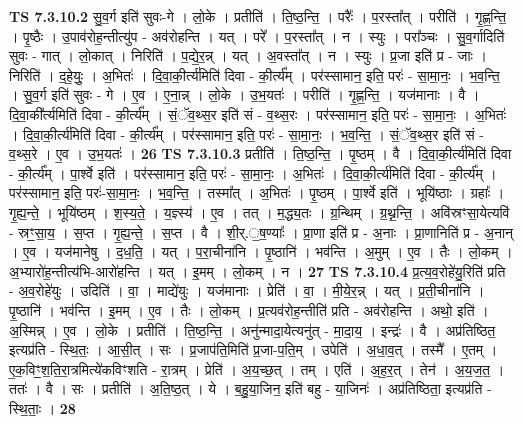 \documentclass[17pt]{extarticle}
\begin{document}
                                \textbf{ TS 7.3.10.2} \newline
                  सु॒व॒र्ग इति॑ सुवः-गे । लो॒के । प्रतीति॑ । ति॒ष्ठ॒न्ति॒ । परैः᳚ । प॒रस्ता᳚त् । परीति॑ । गृ॒ह्ण॒न्ति॒ । पृ॒ष्ठैः । उ॒पाव॑रोह॒न्तीत्यु॑प - अव॑रोहन्ति । यत् । परे᳚ । प॒रस्ता᳚त् । न । स्युः । परा᳚ञ्चः । सु॒व॒र्गादिति॑ सुवः - गात् । लो॒कात् । निरिति॑ । प॒द्ये॒र॒न्न् । यत् । अ॒वस्ता᳚त् । न । स्युः । प्र॒जा इति॑ प्र - जाः । निरिति॑ । द॒हे॒युः॒ । अ॒भितः॑ । दि॒वा॒की॒र्त्य॑मिति॑ दिवा - की॒र्त्य᳚म् । पर॑स्सामान॒ इति॒ परः॑ - सा॒मा॒नः॒ । भ॒व॒न्ति॒ । सु॒व॒र्ग इति॑ सुवः - गे । ए॒व । ए॒ना॒न्न् । लो॒के । उ॒भ॒यतः॑ । परीति॑ । गृ॒ह्ण॒न्ति॒ । यज॑मानाः । वै । दि॒वा॒की᳚र्त्यमिति॑ दिवा - की॒र्त्य᳚म् । सं॒ॅव॒थ्स॒र इति॑ सं - व॒थ्स॒रः । पर॑स्सामान॒ इति॒ परः॑ - सा॒मा॒नः॒ । अ॒भितः॑ । दि॒वा॒की॒र्त्य॑मिति॑ दिवा - की॒र्त्य᳚म् । पर॑स्सामान॒ इति॒ परः॑ - सा॒मा॒नः॒ । भ॒व॒न्ति॒ । सं॒ॅव॒थ्स॒र इति॑ सं - व॒थ्स॒रे । ए॒व । उ॒भ॒यतः॑ । \textbf{  26} \newline
                  \newline
                                \textbf{ TS 7.3.10.3} \newline
                  प्रतीति॑ । ति॒ष्ठ॒न्ति॒ । पृ॒ष्ठम् । वै । दि॒वा॒की॒र्त्य॑मिति॑ दिवा - की॒र्त्य᳚म् । पा॒र्श्वे इति॑ । पर॑स्सामान॒ इति॒ परः॑ - सा॒मा॒नः॒ । अ॒भितः॑ । दि॒वा॒की॒र्त्य॑मिति॑ दिवा - की॒र्त्य᳚म् । पर॑स्सामान॒ इति॒ परः॑-सा॒मा॒नः॒ । भ॒व॒न्ति॒ । तस्मा᳚त् । अ॒भितः॑ । पृ॒ष्ठम् । पा॒र्श्वे इति॑ । भूयि॑ष्ठाः । ग्रहाः᳚ । गृ॒ह्य॒न्ते॒ । भूयि॑ष्ठम् । श॒स्य॒ते॒ । य॒ज्ञ्स्य॑ । ए॒व । तत् । म॒द्ध्य॒तः । ग्र॒न्थिम् । ग्र॒थ्न॒न्ति॒ । अवि॑स्रꣳसा॒येत्यवि॑ - स्रꣳ॒॒सा॒य॒ । स॒प्त । गृ॒ह्य॒न्ते॒ । स॒प्त । वै । शी॒र्.॒ष॒ण्याः᳚ । प्रा॒णा इति॑ प्र - अ॒नाः । प्रा॒णानिति॑ प्र - अ॒नान् । ए॒व । यज॑मानेषु । द॒ध॒ति॒ । यत् । प॒रा॒चीना॑नि । पृ॒ष्ठानि॑ । भव॑न्ति । अ॒मुम् । ए॒व । तैः । लो॒कम् । अ॒भ्यारो॑ह॒न्तीत्य॑भि-आरो॑हन्ति । यत् । इ॒मम् । लो॒कम् । न । \textbf{  27} \newline
                  \newline
                                \textbf{ TS 7.3.10.4} \newline
                  प्र॒त्य॒व॒रोहे॑यु॒रिति॑ प्रति - अ॒व॒रोहे॑युः । उदिति॑ । वा॒ । माद्ये॑युः । यज॑मानाः । प्रेति॑ । वा॒ । मी॒ये॒र॒न्न् । यत् । प्र॒ती॒चीना॑नि । पृ॒ष्ठानि॑ । भव॑न्ति । इ॒मम् । ए॒व । तैः । लो॒कम् । प्र॒त्यव॑रोह॒न्तीति॑ प्रति - अव॑रोहन्ति । अथो॒ इति॑ । अ॒स्मिन्न् । ए॒व । लो॒के । प्रतीति॑ । ति॒ष्ठ॒न्ति॒ । अनु॑न्मादा॒येत्यनु॑त् - मा॒दा॒य॒ । इन्द्रः॑ । वै । अप्र॑तिष्ठित॒ इत्यप्र॑ति - स्थि॒तः॒ । आ॒सी॒त् । सः । प्र॒जाप॑ति॒मिति॑ प्र॒जा-प॒ति॒म् । उपेति॑ । अ॒धा॒व॒त् । तस्मै᳚ । ए॒तम् । ए॒क॒विꣳ॒॒श॒ति॒रा॒त्रमित्ये॑कविꣳशति - रा॒त्रम् । प्रेति॑ । अ॒य॒च्छ॒त् । तम् । एति॑ । अ॒ह॒र॒त् । तेन॑ । अ॒य॒ज॒त॒ । ततः॑ । वै । सः । प्रतीति॑ । अ॒ति॒ष्ठ॒त् । ये । ब॒हु॒या॒जिन॒ इति॑ बहु - या॒जिनः॑ । अप्र॑तिष्ठिता॒ इत्यप्र॑ति - स्थि॒ताः॒ । \textbf{  28} \newline
\end{document}
